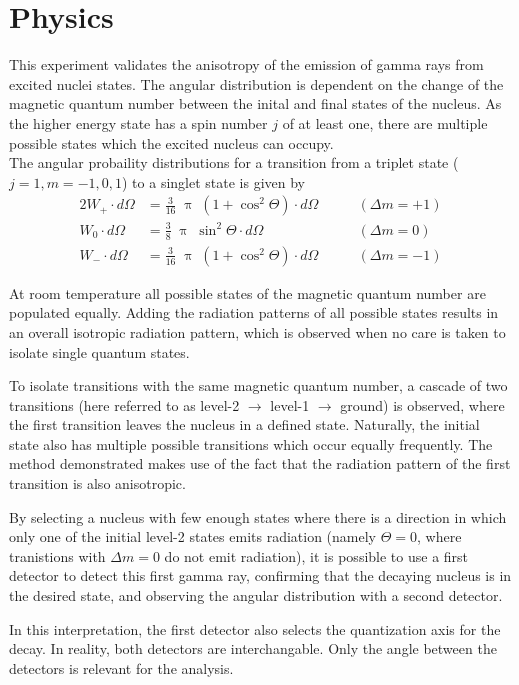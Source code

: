 \section{Physics}
This experiment validates the anisotropy of the emission of gamma rays from excited nuclei states.
The angular distribution is dependent on the change of the magnetic quantum number between the inital and final states of the nucleus.
As the higher energy state has a spin number $j$ of at least one, there are multiple possible states which the excited nucleus can occupy.\\
The angular probaility distributions for a transition from a triplet state ($j=1, m=-1,0,1$) to a singlet state is given by
\begin{alignat}{2}
	W_+ \cdot d\Omega &= \frac{3}{16} \; \uppi \; (1 + \cos^2 \Theta) \cdot d\Omega \qquad &(\Delta m = +1)\\
	W_0 \cdot d\Omega &= \frac{3}{8} \; \uppi \; \sin^2 \Theta \cdot d\Omega \qquad &(\Delta m = 0)\\
	W_- \cdot d\Omega &= \frac{3}{16} \; \uppi \; (1 + \cos^2 \Theta) \cdot d\Omega \qquad &(\Delta m = -1)
\end{alignat}

At room temperature all possible states of the magnetic quantum number are populated equally.
Adding the radiation patterns of all possible states results in an overall isotropic radiation pattern, which is observed when no care is taken to isolate single quantum states.

To isolate transitions with the same magnetic quantum number, a cascade of two transitions (here referred to as level-2 $\rightarrow$ level-1 $\rightarrow$ ground) is observed, where the first transition leaves the nucleus in a defined state.
Naturally, the initial state also has multiple possible transitions which occur equally frequently.
The method demonstrated makes use of the fact that the radiation pattern of the first transition is also anisotropic.

By selecting a nucleus with few enough states where there is a direction in which only one of the initial level-2 states emits radiation (namely $\Theta = 0$, where tranistions with $\Delta m = 0$ do not emit radiation), it is possible to use a first detector to detect this first gamma ray, confirming that the decaying nucleus is in the desired state, and observing the angular distribution with a second detector.

In this interpretation, the first detector also selects the quantization axis for the decay.
In reality, both detectors are interchangable.
Only the angle between the detectors is relevant for the analysis.

